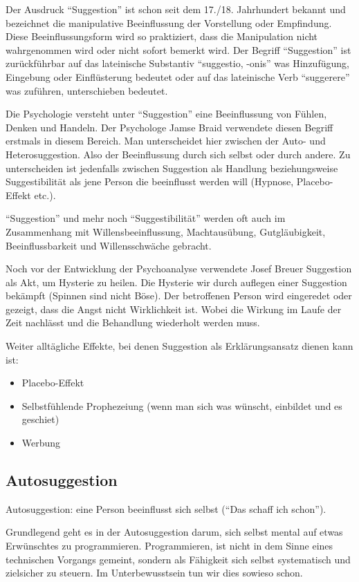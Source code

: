 Der Ausdruck \enquote{Suggestion} ist schon seit dem 17./18. Jahrhundert bekannt und bezeichnet die
manipulative Beeinflussung der Vorstellung oder Empfindung. Diese Beeinflussungsform wird so
praktiziert, dass die Manipulation nicht wahrgenommen wird oder nicht sofort bemerkt wird. Der
Begriff \enquote{Suggestion} ist zurückführbar auf das lateinische Substantiv \enquote{suggestio, -onis} was
Hinzufügung, Eingebung oder Einflüsterung bedeutet oder auf das lateinische Verb \enquote{suggerere} was
zuführen, unterschieben bedeutet.

Die Psychologie versteht unter \enquote{Suggestion} eine Beeinflussung von Fühlen, Denken und Handeln. Der
Psychologe Jamse Braid verwendete diesen Begriff erstmals in diesem Bereich.
Man unterscheidet hier zwischen der Auto- und Heterosuggestion. Also der Beeinflussung durch sich
selbst oder durch andere.
Zu unterscheiden ist jedenfalls zwischen Suggestion als Handlung beziehungsweise Suggestibilität als
jene Person die beeinflusst werden will (Hypnose, Placebo-Effekt etc.).

\enquote{Suggestion} und mehr noch \enquote{Suggestibilität} werden oft auch im Zusammenhang mit
Willensbeeinflussung, Machtausübung, Gutgläubigkeit, Beeinflussbarkeit und Willensschwäche gebracht.

Noch vor der Entwicklung der Psychoanalyse verwendete Josef Breuer Suggestion als Akt, um Hysterie zu
heilen. Die Hysterie wir durch auflegen einer Suggestion bekämpft (\zB Spinnen sind nicht Böse). Der
betroffenen Person wird eingeredet oder gezeigt, dass die Angst nicht Wirklichkeit ist. Wobei die
Wirkung im Laufe der Zeit nachlässt und die Behandlung wiederholt werden muss.

Weiter alltägliche Effekte, bei denen Suggestion als Erklärungsansatz dienen kann ist:
\begin{itemize}
	\item Placebo-Effekt
	\item Selbstfühlende Prophezeiung (wenn man sich was wünscht, einbildet und es geschiet)
	\item Werbung
\end{itemize}

\subsection{Autosuggestion}
Autosuggestion: eine Person beeinflusst sich selbst (\enquote{Das schaff ich schon}).

Grundlegend geht es in der Autosuggestion darum, sich selbst mental auf etwas Erwünschtes zu
programmieren.
Programmieren, ist nicht in dem Sinne eines technischen Vorgangs gemeint, sondern als Fähigkeit sich
selbst systematisch und zielsicher zu steuern. Im Unterbewusstsein tun wir dies sowieso schon.

